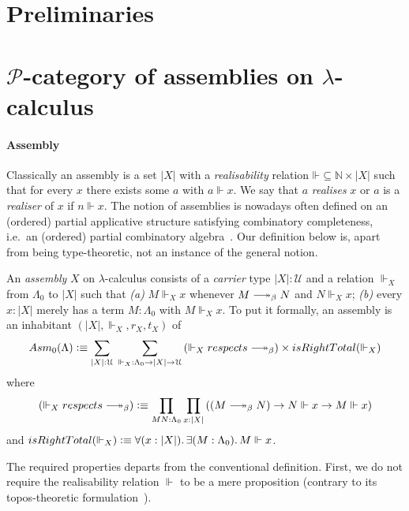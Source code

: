 \documentclass[a4paper,UKenglish,numberwithinsect,cleveref,thm-restate]{lipics-v2021}
\newcommand{\PP}{\mathscr{P}}
\newcommand{\Asm}{\mathsf{Asm}}
\newcommand{\defeq}{\vcentcolon\equiv}
\newcommand{\Univ}{\mathcal{U}}
\DeclareRobustCommand\longtwoheadrightarrow{\relbar\joinrel\twoheadrightarrow}
\newcommand{\reduce}{\longtwoheadrightarrow_{\beta}}
\theoremstyle{plain}
\begin{document}
\section{Preliminaries}\label{sec:preliminaries}


\section{\texorpdfstring{$\PP$}{P}-category of assemblies on \texorpdfstring{$\lambda$}{λ}-calculus}\label{sec:assemblies}

\paragraph*{Assembly}
Classically an assembly is a set $|X|$ with a \emph{realisability} relation $\mathord{\Vdash} \subseteq \mathbb{N} \times |X|$ such that for every $x$ there exists some $a$ with $a \Vdash x$. We say that $a$ \emph{realises} $x$ or $a$ is a \emph{realiser} of $x$ if $n \Vdash x$.
The notion of assemblies is nowadays often defined on an (ordered) partial applicative structure satisfying combinatory completeness, i.e.\ an (ordered) partial combinatory algebra~\cite{Oosten2008}.
Our definition below is, apart from being type-theoretic, not an instance of the general notion.
\begin{definition}\label{def:assembly}
  An \emph{assembly} $X$ on $\lambda$-calculus consists of a \emph{carrier} type $|X| : \Univ$ and a relation ${\Vdash_X}$ from $\Lambda_0$ to $|X|$ such that
  \emph{(a)} $M \Vdash_X x$ whenever $M \reduce N$ and $N \Vdash_X x$;
  \emph{(b)} every $x : |X|$ merely has a term $M : \Lambda_0$ with $M \Vdash_X x$. 
  To put it formally, an assembly is an inhabitant $(|X|, \Vdash_X, r_X, t_X)$ of
  \[
    \Asm_0(\Lambda) \defeq \sum_{|X| : \Univ}\;\sum_{\mathord{\Vdash_X}:\Lambda_0 \to |X| \to \Univ} 
    \left(\mathord{\Vdash_X}\;\mathsf{respects}\;\mathord{\reduce}\right)
      \times \mathsf{isRightTotal}({\Vdash_X})
  \]
  where 
  \[
    \left(\mathord{\Vdash_X}\;\mathsf{respects}\;\mathord{\reduce}\right) \defeq
    \prod_{M N : \Lambda_0} \prod_{x : |X|} \left( \left(M \reduce N\right) \to N \Vdash x \to M \Vdash x \right)
  \]
  and $\mathsf{isRightTotal}(\Vdash_X) \defeq \forall (x : |X|).\, \exists (M : \Lambda_0).\, M \Vdash x$.
\end{definition}
The required properties departs from the conventional definition. 
First, we do not require the realisability relation $\Vdash$ to be a mere proposition (contrary to its topos-theoretic formulation~\cite{Birkedal2002a}).
\end{document}
